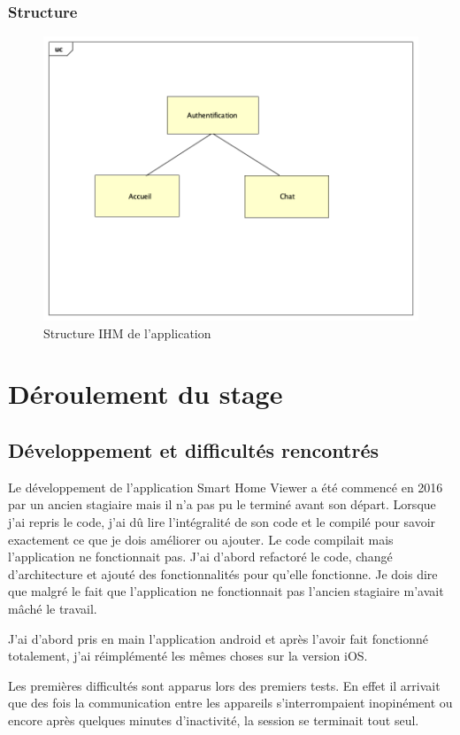 \subsubsection*{Structure}
\begin{figure}[H]
	\centering
	\includegraphics[scale=0.4]{assets/images/ihm.png}
	\caption{Structure IHM de l'application}
	\label{fig.8}
\end{figure}
\section{Déroulement du stage}
\subsection{Développement et difficultés rencontrés}
Le développement de l'application Smart Home Viewer a été commencé en 2016 par un ancien stagiaire mais il n'a pas pu le terminé avant son départ. Lorsque j'ai repris le code, j'ai dû lire l'intégralité de son code et le compilé pour savoir exactement ce que je dois améliorer ou ajouter. Le code compilait mais l'application ne fonctionnait pas. J'ai d'abord refactoré le code, changé d'architecture et ajouté des fonctionnalités pour qu'elle fonctionne. Je dois dire que malgré le fait que l'application ne fonctionnait pas l'ancien stagiaire m'avait mâché le travail.

J'ai d'abord pris en main l'application android et après l'avoir fait fonctionné totalement, j'ai réimplémenté les mêmes choses sur la version iOS.

Les premières difficultés sont apparus lors des premiers tests. En effet il arrivait que des fois la communication entre les appareils s'interrompaient inopinément ou encore après quelques minutes d'inactivité, la session se terminait tout seul.

